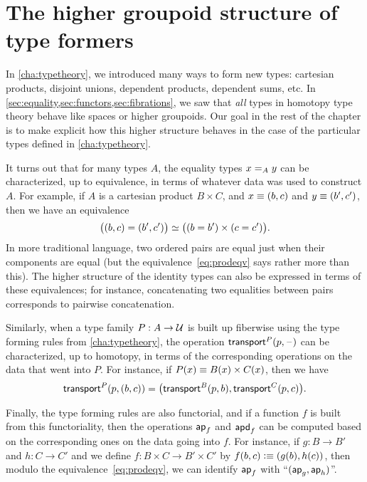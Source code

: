 %


\section{The higher groupoid structure of type formers}
\label{sec:computational}

In \cref{cha:typetheory}, we introduced many ways to form new types: cartesian products, disjoint unions, dependent products, dependent sums, etc.
In \cref{sec:equality,sec:functors,sec:fibrations}, we saw that \emph{all} types in homotopy type theory behave like spaces or higher groupoids.
Our goal in the rest of the chapter is to make explicit how this higher structure behaves in the case of the particular types defined in \cref{cha:typetheory}.

It turns out that for many types $A$, the equality types $\id[A]xy$ can be characterized, up to equivalence, in terms of whatever data was used to construct $A$.
For example, if $A$ is a cartesian product $B\times C$, and $x\jdeq (b,c)$ and $y\jdeq(b',c')$, then we have an equivalence
\begin{equation}\label{eq:prodeqv}
  \eqv{\big((b,c)=(b',c')\big)}{\big((b=b')\times (c=c')\big)}.
\end{equation}
In more traditional language, two ordered pairs are equal just when their components are equal (but the equivalence~\eqref{eq:prodeqv} says rather more than this).
The higher structure of the identity types can also be expressed in terms of these equivalences; for instance, concatenating two equalities between pairs corresponds to pairwise concatenation.

Similarly, when a type family $P:A\to\type$ is built up fiberwise using the type forming rules from \cref{cha:typetheory}, the operation $\transfib{P}{p}{\blank}$ can be characterized, up to homotopy, in terms of the corresponding operations on the data that went into $P$.
For instance, if $P(x) \jdeq B(x)\times C(x)$, then we have
\[\transfib{P}{p}{(b,c)} = \big(\transfib{B}{p}{b},\transfib{C}{p}{c}\big).\]

Finally, the type forming rules are also functorial, and if a function $f$ is built from this functoriality, then the operations $\apfunc f$ and $\apdfunc f$ can be computed based on the corresponding ones on the data going into $f$.
For instance, if $g:B\to B'$ and $h:C\to C'$ and we define $f:B\times C \to B'\times C'$ by $f(b,c)\defeq (g(b),h(c))$, then modulo the equivalence~\eqref{eq:prodeqv}, we can identify $\apfunc f$ with ``$(\apfunc g,\apfunc h)$''.

